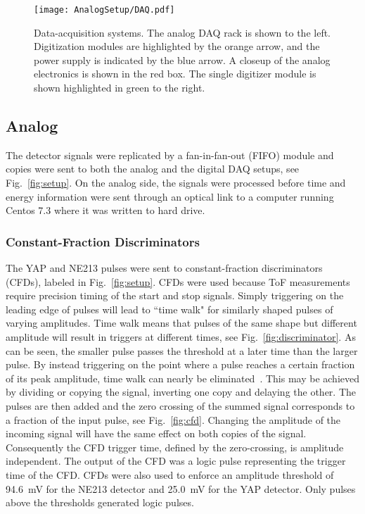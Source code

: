 \documentclass[main.tex]{subfiles}
\begin{document}
\begin{figure}[h]
    \centering
        \texttt{[image: AnalogSetup/DAQ.pdf]}
        \caption[Data-acquisition systems.]{Data-acquisition systems. The analog DAQ rack is shown to the left. Digitization modules are highlighted by the orange arrow, and the power supply is indicated by the blue arrow. A closeup of the analog electronics is shown in the red box. The single digitizer module is shown highlighted in green to the right.}
    \label{fig:DAQ}
\end{figure}

\subsection{Analog}
The detector signals were replicated by a fan-in-fan-out (FIFO) module and copies were sent to both the analog and the digital DAQ setups, see Fig.~\ref{fig:setup}. On the analog side, the signals were processed before time and energy information were sent through an optical link to a computer running Centos 7.3 where it was written to hard drive. 

\subsubsection{Constant-Fraction Discriminators}
The YAP and NE213 pulses were sent to constant-fraction discriminators (CFDs), labeled  in Fig.~\ref{fig:setup}. CFDs were used because ToF measurements require precision timing of the start and stop signals. Simply triggering on the leading edge of pulses will lead to ``time walk" for similarly shaped pulses of varying amplitudes. Time walk means that pulses of the same shape but different amplitude will result in triggers at different times, see Fig.~\ref{fig:discriminator}. As can be seen, the smaller pulse passes the threshold at a later time than the larger pulse. By instead triggering on the point where a pulse reaches a certain fraction of its peak amplitude, time walk can nearly be eliminated~\cite{Leo}. This may be achieved by dividing or copying the signal, inverting one copy and delaying the other. The pulses are then added and the zero crossing of the summed signal corresponds to a fraction of the input pulse, see Fig.~\ref{fig:cfd}. Changing the amplitude of the incoming signal will have the same effect on both copies of the signal. Consequently the CFD trigger time, defined by the zero-crossing, is amplitude independent. The output of the CFD was a logic pulse representing the trigger time of the CFD. CFDs were also used to enforce an amplitude threshold of \SI{94.6}{mV} for the NE213 detector and \SI{25.0}{mV} for the YAP detector. Only pulses above the thresholds generated logic pulses.
\end{document}
